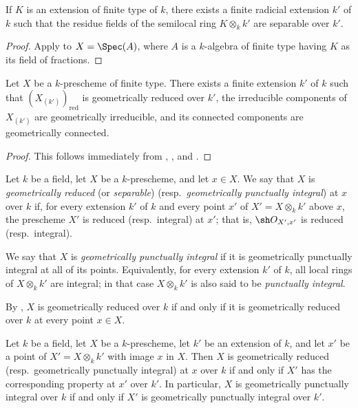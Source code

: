 \begin{corollary}[4.6.7]
\label{IV.4.6.7}
If $K$ is an extension of finite type of $k$, there exists a finite
radicial extension $k'$ of $k$ such that the residue fields of the
semilocal ring $K\otimes_k k'$ are separable over $k'$.
\end{corollary}

\begin{proof}
Apply  to $X=\Spec(A)$, where $A$ is a $k$-algebra of
finite type having $K$ as its field of fractions.
\end{proof}

\begin{corollary}[4.6.8]
\label{IV.4.6.8}
Let $X$ be a $k$-prescheme of finite type.
There exists a finite extension $k'$ of $k$ such that
$(X_{(k')})_{\mathrm{red}}$ is geometrically reduced over $k'$, the
irreducible components of $X_{(k')}$ are geometrically irreducible,
and its connected components are geometrically connected.
\end{corollary}

\begin{proof}
This follows immediately from ,
, and .
\end{proof}

\begin{definition}[4.6.9]
\label{IV.4.6.9}
Let $k$ be a field, let $X$ be a $k$-prescheme, and let $x\in X$.
We say that $X$ is \emph{geometrically reduced}
(or \emph{separable}) (resp.\ \emph{geometrically punctually
integral}) at $x$ over $k$ if, for every extension $k'$ of $k$ and
every point $x'$ of $X'=X\otimes_k k'$ above $x$, the prescheme $X'$
is reduced (resp.\ integral) at $x'$; that is,
$\sh O_{X',x'}$ is reduced (resp.\ integral).

We say that $X$ is \emph{geometrically punctually integral} if it is
geometrically punctually integral at all of its points.
Equivalently, for every extension $k'$ of $k$, all local rings of
$X\otimes_k k'$ are integral; in that case $X\otimes_k k'$ is also
said to be \emph{punctually integral}.
\end{definition}

By , $X$ is geometrically reduced over $k$ if and only
if it is geometrically reduced over $k$ at every point $x\in X$.

\begin{proposition}[4.6.10]
\label{IV.4.6.10}
Let $k$ be a field, let $X$ be a $k$-prescheme, let $k'$ be an
extension of $k$, and let $x'$ be a point of
$X'=X\otimes_k k'$ with image $x$ in $X$.
Then $X$ is geometrically reduced
(resp.\ geometrically punctually integral) at $x$ over $k$ if and only
if $X'$ has the corresponding property at $x'$ over $k'$.
In particular, $X$ is geometrically punctually integral over $k$ if
and only if $X'$ is geometrically punctually integral over $k'$.
\end{proposition}

